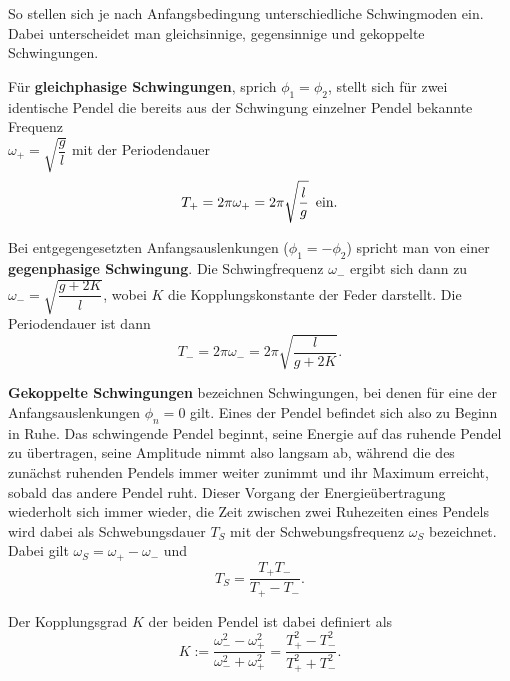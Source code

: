 So stellen sich je nach Anfangsbedingung unterschiedliche Schwingmoden ein. Dabei unterscheidet man gleichsinnige, gegensinnige und gekoppelte Schwingungen. \\

\newpage

Für \textbf{gleichphasige Schwingungen}, sprich $\phi_1=\phi_2$, stellt sich für zwei identische Pendel die bereits aus der Schwingung einzelner Pendel bekannte Frequenz \\ 
$\omega_+=\sqrt{\dfrac{g}{l}}$ mit der Periodendauer 
\begin{equation}
T_+ = 2\pi \omega_+ = 2\pi \sqrt{\dfrac{l}{g}} \text{\, ein.}
\label{eq:T_+}
\end{equation}

Bei entgegengesetzten Anfangsauslenkungen ($\phi_1=-\phi_2$) spricht man von einer \\ 
\textbf{gegenphasige Schwingung}. Die Schwingfrequenz $\omega_-$ ergibt sich dann zu \\
$\omega_- = \sqrt{\dfrac{g+2K}{l}}$, wobei $K$ die Kopplungskonstante der Feder darstellt.
Die Periodendauer ist dann 
\begin{equation}
    T_- = 2 \pi \omega_- = 2 \pi \sqrt{\dfrac{l}{g+2K}}\text{.}
\label{eq:T_-}
\end{equation}

\textbf{Gekoppelte Schwingungen} bezeichnen Schwingungen, bei denen für eine der Anfangsauslenkungen $\phi_n = 0$ gilt. Eines der Pendel befindet sich also zu Beginn in Ruhe.
Das schwingende Pendel beginnt, seine Energie auf das ruhende Pendel zu übertragen, seine Amplitude nimmt also langsam ab, während die des zunächst ruhenden Pendels immer weiter zunimmt und ihr Maximum erreicht, sobald das andere Pendel ruht.
Dieser Vorgang der Energieübertragung wiederholt sich immer wieder, die Zeit zwischen zwei Ruhezeiten eines Pendels wird dabei als Schwebungsdauer $T_S$ mit der Schwebungsfrequenz $\omega_S$ bezeichnet. \\
Dabei gilt $\omega_S= \omega_+ -\omega_-$ und
\begin{equation}
    T_S = \dfrac{T_+ T_-}{T_+ - T_-} \text{.}
\label{eq:T_S}
\end{equation}

Der Kopplungsgrad $K$ der beiden Pendel ist dabei definiert als
\begin{equation} 
    K := \dfrac{\omega_-^2-\omega_+^2}{\omega_-^2 + \omega_+^2} = \dfrac{T_+^2 - T_-^2}{T_+^2 + T_-^2} \text{.}
\label{eq:Kopplungsgrad}
\end{equation}




